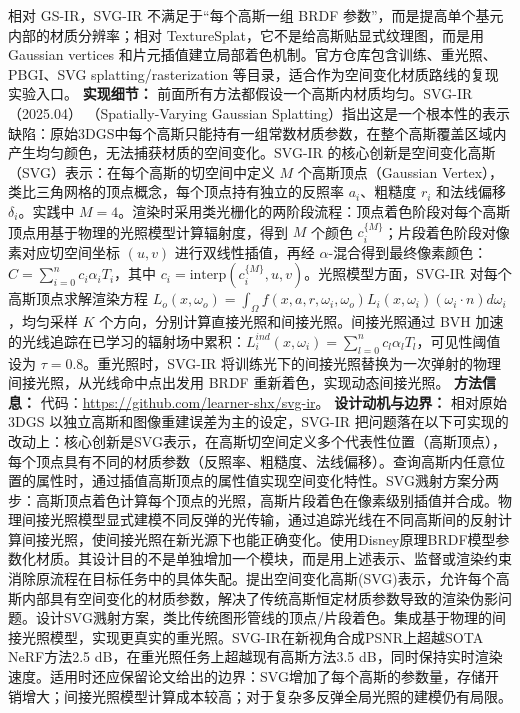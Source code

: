 相对 GS-IR，SVG-IR 不满足于“每个高斯一组 BRDF 参数”，而是提高单个基元内部的材质分辨率；相对 TextureSplat，它不是给高斯贴显式纹理图，而是用 Gaussian vertices 和片元插值建立局部着色机制。官方仓库包含训练、重光照、PBGI、SVG splatting/rasterization 等目录，适合作为空间变化材质路线的复现实验入口。
\textbf{实现细节：} 前面所有方法都假设一个高斯内材质均匀。SVG-IR（2025.04） （Spatially-Varying Gaussian Splatting）指出这是一个根本性的表示缺陷：原始3DGS中每个高斯只能持有一组常数材质参数，在整个高斯覆盖区域内产生均匀颜色，无法捕获材质的空间变化。SVG-IR 的核心创新是空间变化高斯（SVG）表示：在每个高斯的切空间中定义 $M$ 个高斯顶点（Gaussian Vertex），类比三角网格的顶点概念，每个顶点持有独立的反照率 $a_i$、粗糙度 $r_i$ 和法线偏移 $\delta_i$。实践中 $M=4$。渲染时采用类光栅化的两阶段流程：顶点着色阶段对每个高斯顶点用基于物理的光照模型计算辐射度，得到 $M$ 个颜色 $c_i^{\{M\}}$；片段着色阶段对像素对应切空间坐标 $(u,v)$ 进行双线性插值，再经 $\alpha$-混合得到最终像素颜色：$C = \sum_{i=0}^n c_i \alpha_i T_i$，其中 $c_i = \mathrm{interp}(c_i^{\{M\}}, u, v)$。光照模型方面，SVG-IR 对每个高斯顶点求解渲染方程 $L_o(x, \omega_o) = \int_{\Omega} f(x, a, r, \omega_i, \omega_o) L_i(x, \omega_i)(\omega_i \cdot n) d\omega_i$，均匀采样 $K$ 个方向，分别计算直接光照和间接光照。间接光照通过 BVH 加速的光线追踪在已学习的辐射场中累积：$L_i^{ind}(x, \omega_i) = \sum_{l=0}^n c_l \alpha_l T_l$，可见性阈值设为 $\tau=0.8$。重光照时，SVG-IR 将训练光下的间接光照替换为一次弹射的物理间接光照，从光线命中点出发用 BRDF 重新着色，实现动态间接光照。
\textbf{方法信息：} 代码：\url{https://github.com/learner-shx/svg-ir}。
\textbf{设计动机与边界：} 相对原始 3DGS 以独立高斯和图像重建误差为主的设定，SVG-IR 把问题落在以下可实现的改动上：核心创新是SVG表示，在高斯切空间定义多个代表性位置（高斯顶点），每个顶点具有不同的材质参数（反照率、粗糙度、法线偏移）。查询高斯内任意位置的属性时，通过插值高斯顶点的属性值实现空间变化特性。SVG溅射方案分两步：高斯顶点着色计算每个顶点的光照，高斯片段着色在像素级别插值并合成。物理间接光照模型显式建模不同反弹的光传输，通过追踪光线在不同高斯间的反射计算间接光照，使间接光照在新光源下也能正确变化。使用Disney原理BRDF模型参数化材质。其设计目的不是单独增加一个模块，而是用上述表示、监督或渲染约束消除原流程在目标任务中的具体失配。提出空间变化高斯(SVG)表示，允许每个高斯内部具有空间变化的材质参数，解决了传统高斯恒定材质参数导致的渲染伪影问题。设计SVG溅射方案，类比传统图形管线的顶点/片段着色。集成基于物理的间接光照模型，实现更真实的重光照。SVG-IR在新视角合成PSNR上超越SOTA NeRF方法2.5 dB，在重光照任务上超越现有高斯方法3.5 dB，同时保持实时渲染速度。适用时还应保留论文给出的边界：SVG增加了每个高斯的参数量，存储开销增大；间接光照模型计算成本较高；对于复杂多反弹全局光照的建模仍有局限。
